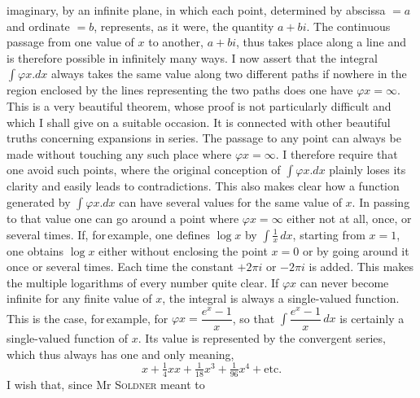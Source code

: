 %
imaginary, by an infinite plane, in which each point, determined by abscissa $=a$ and ordinate $=b$, represents, as it were, the quantity $a+bi$. The continuous passage from one value of $x$ to another, $a+bi$, thus takes place along a line and is therefore possible in infinitely many ways. I now assert that the integral $\int \varphi x\mathord{.} dx$ always takes the same value along two different paths if nowhere in the region enclosed by the lines representing the two paths does one have $\varphi x = \infty$. This is a very beautiful theorem, whose proof is not particularly difficult and which I shall give on a suitable occasion. It is connected with other beautiful truths concerning expansions in series. The passage to any point can always be made without touching any such place where $\varphi x=\infty$. I therefore require that one avoid such points, where the original conception of $\int \varphi x\mathord{.} dx$ plainly loses its clarity and easily leads to contradictions. This also makes clear how a function generated by $\int \varphi x\mathord{.} dx$ can have several values for the same value of $x$. In passing to that value one can go around a point where $\varphi x=\infty$ either not at all, once, or several times. If, for\,example, one defines $\log x$ by $\int \frac{1}{x}\,dx$, starting from $x=1$, one obtains $\log x$ either without enclosing the point $x=0$ or by going around it once or several times. Each time the constant $+2\pi i$ or $-2\pi i$ is added. This makes the multiple logarithms of every number quite clear. If $\varphi x$ can never become infinite for any finite value of $x$, the integral is always a single-valued function. This is the case, for\,example, for $\varphi x = \dfrac{e^x-1}{x}$, so that $\int \dfrac{e^x-1}{x}\,dx$ is certainly a single-valued function of $x$. Its value is represented by the  convergent series, which thus always has one and only  meaning,
\[
x+\tfrac{1}{4}xx+\tfrac{1}{18}x^3+\tfrac{1}{96}x^4+\text{etc.}
\]
\noindent I wish that, since Mr \textsc{Soldner} meant to%
